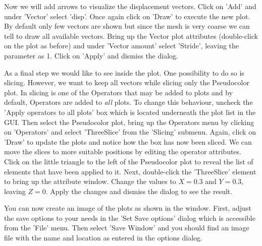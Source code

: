 Now we will add arrows to visualize the displacement vectors. Click on 'Add'
and under 'Vector' select 'disp'. Once again click on 'Draw' to execute the
new plot. By default only few vectors are shown but since the mesh is very
coarse we can tell \VisIt to draw all available vectors.
Bring up the Vector plot attributes (double-click on the plot as before) and
under 'Vector amount' select 'Stride', leaving the parameter as 1.
Click on 'Apply' and dismiss the dialog.

As a final step we would like to see inside the plot. One possibility to do so
is slicing. However, we want to keep all vectors while slicing only the
Pseudocolor plot. In \VisIt slicing is one of the Operators that may be added
to plots and by default, Operators are added to \emph{all} plots.
To change this behaviour, uncheck the 'Apply operators to all plots' box which
is located underneath the plot list in the GUI.
Then select the Pseudocolor plot, bring up the Operators menu by clicking on
'Operators' and select 'ThreeSlice' from the 'Slicing' submenu.
Again, click on 'Draw' to update the plots and notice how the box has now been
sliced. We can move the slices to more suitable positions by editing the
operator attributes. Click on the little triangle to the left of the
Pseudocolor plot to reveal the list of elements that have been applied to it.
Next, double-click the 'ThreeSlice' element to bring up the attribute window.
Change the values to $X=0.3$ and $Y=0.3$, leaving $Z=0$. Apply the changes and
dismiss the dialog to see the result.

You can now create an image of the plots as shown in the window. First, adjust
the save options to your needs in the 'Set Save options' dialog which is
accessible from the 'File' menu. Then select 'Save Window' and you should find
an image file with the name and location as entered in the options dialog.

